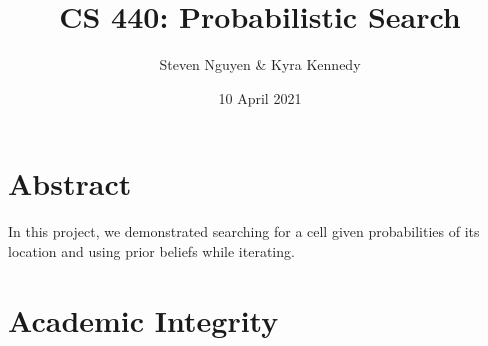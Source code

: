 \documentclass[12pt]{report}
\title{CS 440: Probabilistic Search}
\author{Steven Nguyen \& Kyra Kennedy}
\date{10 April 2021}
\begin{document}
\begin{titlepage}
\maketitle
\end{titlepage}

\section{Abstract}
In this project, we demonstrated searching for a cell given probabilities of its location and using prior beliefs while iterating.

\section{Academic Integrity}
\end{document}
